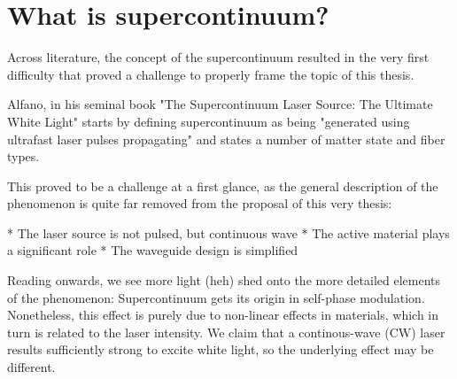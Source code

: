 \section{What is supercontinuum?}

Across literature, the concept of the supercontinuum resulted in the very first difficulty that proved a challenge to properly frame the topic of this thesis.

Alfano, in his seminal book "The Supercontinuum Laser Source: The Ultimate White Light" starts by defining supercontinuum as being "generated using ultrafast laser pulses propagating" and states a number of matter state and fiber types.

This proved to be a challenge at a first glance, as the general description of the phenomenon is quite far removed from the proposal of this very thesis:

* The laser source is not pulsed, but continuous wave
* The active material plays a significant role 
* The waveguide design is simplified

Reading onwards, we see more light (heh) shed onto the more detailed elements of the phenomenon: Supercontinuum gets its origin in self-phase modulation. Nonetheless, this effect is purely due to non-linear effects in materials, which in turn is related to the laser intensity. We claim that a continous-wave (CW) laser results sufficiently strong to excite white light, so the underlying effect may be different.
 
